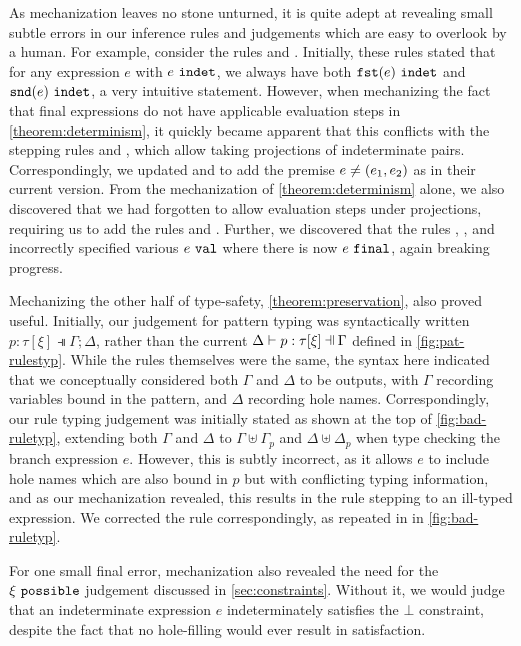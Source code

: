 As mechanization leaves no stone unturned, it is quite adept at revealing small subtle errors in our inference rules and judgements which are easy to overlook by a human. For example, consider the rules \IFst and \ISnd. Initially, these rules stated that for any expression $e$ with $e ~\mathtt{indet}$, we always have both $\mathtt{fst}(e) ~\mathtt{indet}$ and $\mathtt{snd}(e) ~\mathtt{indet}$, a very intuitive statement. However, when mechanizing the fact that final expressions do not have applicable evaluation steps in \autoref{theorem:determinism}, it quickly became apparent that this conflicts with the stepping rules \ITFstPair and \ITSndPair, which allow taking projections of indeterminate pairs. Correspondingly, we updated \IFst and \ISnd to add the premise $e \neq (e_1 , e_2)$ as in their current version. From the mechanization of \autoref{theorem:determinism} alone, we also discovered that we had forgotten to allow evaluation steps under projections, requiring us to add the rules \ITFst and \ITSnd. Further, we discovered that the rules \ITApArg, \ITAp, and \ITPairR incorrectly specified various $e ~\mathtt{val}$ where there is now $e ~\mathtt{final}$, again breaking progress. 



Mechanizing the other half of type-safety, \autoref{theorem:preservation}, also proved useful. Initially, our judgement for pattern typing was syntactically written $p : \tau [\xi] \dashV \Gamma; \Delta$, rather than the current $\chpattyp{p}{\tau}{\xi}{\Gamma}{\Delta}$ defined in \autoref{fig:pat-rulestyp}. While the rules themselves were the same, the syntax here indicated that we conceptually considered both $\Gamma$ and $\Delta$ to be outputs, with $\Gamma$ recording variables bound in the pattern, and $\Delta$ recording hole names. Correspondingly, our rule typing judgement was initially stated as \BadTRule shown at the top of \autoref{fig:bad-ruletyp}, extending both $\Gamma$ and $\Delta$ to $\Gamma \uplus \Gamma_p$ and $\Delta \uplus \Delta_p$ when type checking the branch expression $e$. However, this is subtly incorrect, as it allows $e$ to include hole names which are also bound in $p$ but with conflicting typing information, and as our mechanization revealed, this results in the \ITSuccMatch rule stepping to an ill-typed expression. We corrected the rule correspondingly, as repeated in \GoodTRule in \autoref{fig:bad-ruletyp}.

For one small final error, mechanization also revealed the need for the $\xi ~\mathtt{possible}$ judgement discussed in \autoref{sec:constraints}. Without it, we would judge that an indeterminate expression $e$ indeterminately satisfies the $\bot$ constraint, despite the fact that no hole-filling would ever result in satisfaction.

